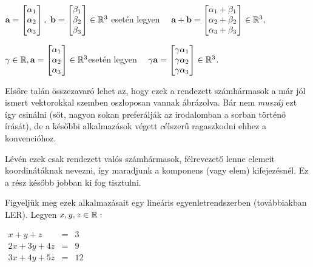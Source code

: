 \documentclass[a4paper,11.5pt]{article}
\begin{document}
		{\centering
			$ \a=
			\begin{bmatrix}
			\alpha_{1}\s \\
			\alpha_{2}\s \\
			\alpha_{3}\s \\
			\end{bmatrix},~ \b =
			\begin{bmatrix}
			\beta_{1}\s \\
			\beta_{2}\s \\
			\beta_{3}\s \\
			\end{bmatrix} \in  \R^{3}$ \quad esetén legyen $\quad \a + \b= 
			\begin{bmatrix}
			\alpha_{1}+\beta_{1}\s \\
			\alpha_{2}+\beta_{2}\s \\
			\alpha_{3}+\beta_{3}\s \\
			\end{bmatrix} \in  \R^{3}, $
			
			$\gamma\in  \R,  \a =
			\begin{bmatrix}
			\alpha_{1}\s \\
			\alpha_{2}\s \\
			\alpha_{3}\s \\
			\end{bmatrix} \in  \R^{3}$\qquad esetén legyen $\quad\gamma\a=
			\begin{bmatrix}
			\gamma\alpha_{1}\s \\
			\gamma\alpha_{2}\s \\
			\gamma\alpha_{3}\s \\
			\end{bmatrix} \in \R^{3}$.
			\par}
	
	\noindent Elsőre talán összezavaró lehet az, hogy ezek a rendezett számhármasok a már jól ismert vektorokkal szemben oszloposan vannak ábrázolva. Bár nem \emph{muszáj} ezt így csinálni (sőt, nagyon sokan preferálják az irodalomban a sorban történő írását), de a későbbi alkalmazások végett célszerű ragaszkodni ehhez a konvencióhoz.
	
	Lévén ezek csak rendezett valós számhármasok, félrevezető lenne elemeit koordinátáknak nevezni, így maradjunk a komponens (vagy elem) kifejezésnél. Ez a rész később jobban ki fog tisztulni.
	
	Figyeljük meg ezek alkalmazásait egy lineáris egyenletrendszerben (továbbiakban LER). Legyen $x, y, z \in \mathbb{R}:$
	
	{\centering
		$\begin{matrix} 
		x + y + z &=& 3\\
		2x + 3y + 4z &=& 9\\
		3x + 4y + 5z& =& 12
		\end{matrix}$
		\par}
\end{document}
